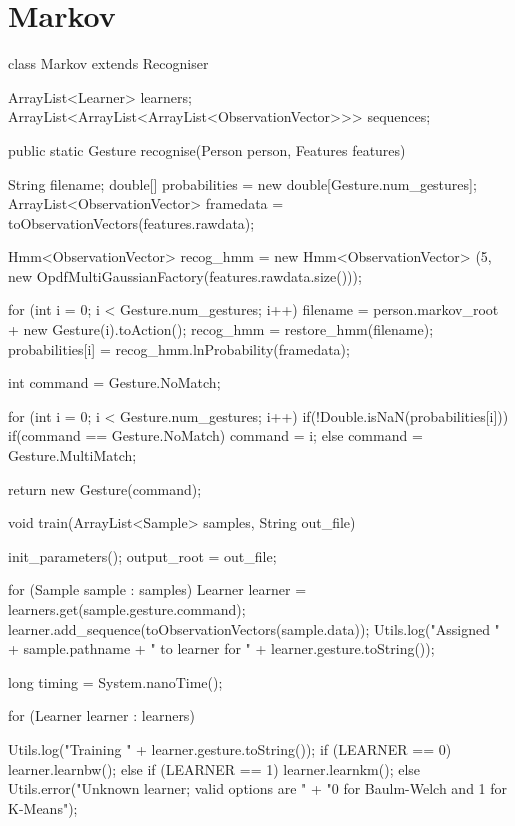 \documentclass[12pt,a4,notitlepage]{report}
\renewcommand{\_}{\texttt{\symbol{95}}}
\newcommand{\<}{\texttt{\symbol{60}}}
\renewcommand{\>}{\texttt{\symbol{62}}}
\newcommand{\class}[1]{\textbf{#1}}
\begin{document}
\section{\class{Markov}}
\begin{code}
class Markov extends Recogniser
{

   ArrayList<Learner> learners;
   ArrayList<ArrayList<ArrayList<ObservationVector>>> sequences;
   
   public static Gesture recognise(Person person, Features features)
   {
      String filename;
      double[] probabilities = new double[Gesture.num_gestures];
      ArrayList<ObservationVector> framedata = 
        toObservationVectors(features.rawdata);
      
      Hmm<ObservationVector> recog_hmm = new Hmm<ObservationVector>
        (5, new OpdfMultiGaussianFactory(features.rawdata.size()));
            
      for (int i = 0; i < Gesture.num_gestures; i++)
      {
         filename  = person.markov_root + new Gesture(i).toAction();
         recog_hmm = restore_hmm(filename);
         probabilities[i] = recog_hmm.lnProbability(framedata);
      }

      int command = Gesture.NoMatch;
            
      for (int i = 0; i < Gesture.num_gestures; i++)
      {
         if(!Double.isNaN(probabilities[i]))
         {
            if(command == Gesture.NoMatch)
               command = i;
            else
               command = Gesture.MultiMatch;
         }
      }

      return new Gesture(command);
   }

   void train(ArrayList<Sample> samples, String out_file)
   {
      init_parameters();
      output_root = out_file;

      for (Sample sample : samples)
      {
         Learner learner = learners.get(sample.gesture.command);
         learner.add_sequence(toObservationVectors(sample.data));
         Utils.log("Assigned " + sample.pathname +
          " to learner for " + learner.gesture.toString());
      }
      
      long timing = System.nanoTime();
      
      for (Learner learner : learners)
      {
         Utils.log("Training " + learner.gesture.toString());
         if (LEARNER == 0)
         {  
            learner.learnbw();
         }
         else if (LEARNER == 1)
         {
            learner.learnkm();
         }
         else
         {
            Utils.error("Unknown learner; valid options are " +
               "0 for Baulm-Welch and 1 for K-Means");
         }
         
}}}
\end{code}
\end{document}
